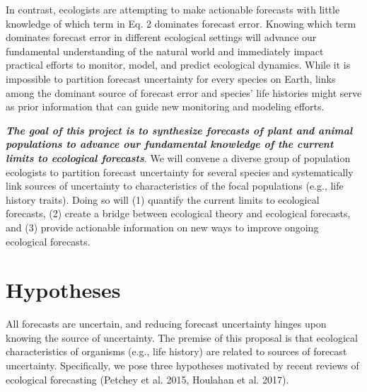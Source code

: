 \documentclass[12pt,]{article}
\begin{document}
In contrast, ecologists are attempting to make actionable forecasts with
little knowledge of which term in Eq. 2 dominates forecast error.
Knowing which term dominates forecast error in different ecological
settings will advance our fundamental understanding of the natural world
and immediately impact practical efforts to monitor, model, and predict
ecological dynamics. While it is impossible to partition forecast
uncertainty for every species on Earth, links among the dominant source
of forecast error and species' life histories might serve as prior
information that can guide new monitoring and modeling efforts.

\textbf{\emph{The goal of this project is to synthesize forecasts of plant and animal populations to advance our fundamental knowledge of the current limits to ecological forecasts}}.
We will convene a diverse group of population ecologists to partition
forecast uncertainty for several species and systematically link sources
of uncertainty to characteristics of the focal populations (e.g., life
history traits). Doing so will (1) quantify the current limits to
ecological forecasts, (2) create a bridge between ecological theory and
ecological forecasts, and (3) provide actionable information on new ways
to improve ongoing ecological forecasts.

\section{Hypotheses}

All forecasts are uncertain, and reducing forecast uncertainty hinges
upon knowing the source of uncertainty. The premise of this proposal is
that ecological characteristics of organisms (e.g., life history) are
related to sources of forecast uncertainty. Specifically, we pose three
hypotheses motivated by recent reviews of ecological forecasting
(Petchey et al. 2015, Houlahan et al. 2017).
\end{document}
